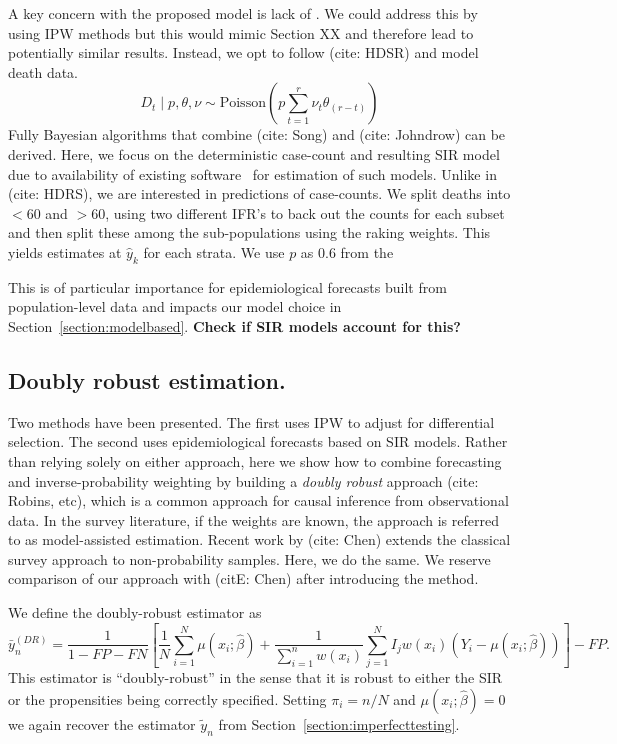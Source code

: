 \documentclass[11pt]{amsart}
\begin{document}
A key concern with the proposed model is lack of . We could address this by using IPW methods but this would mimic Section XX and therefore lead to potentially similar results.  Instead, we opt to follow (cite: HDSR) and model death data.
$$
D_t \mid p, \theta, \nu \sim \text{Poisson} \left( p \sum_{t=1}^r \nu_t \theta_{(r-t)} \right)
$$
Fully Bayesian algorithms that combine (cite: Song) and (cite: Johndrow) can be derived.  Here, we focus on the deterministic case-count and resulting SIR model due to availability of existing software~\cite{Song2020} for estimation of such models. Unlike in (cite: HDRS), we are interested in predictions of case-counts.  We split deaths into $<60$ and $>60$, using two different IFR's to back out the counts for each subset and then split these among the sub-populations using the raking weights.  This yields estimates at $\hat y_k$ for each strata.  We use $p$ as 0.6 from the


This is of particular importance for epidemiological forecasts built from population-level data and impacts our model choice in Section~\ref{section:modelbased}.
{\bf Check if SIR models account for this?}

\subsection{Doubly robust estimation.}
Two methods have been presented.  The first uses IPW to adjust for differential selection.  The second uses epidemiological forecasts based on SIR models.  Rather than relying solely on either approach, here we show how to combine forecasting and inverse-probability weighting by building a \emph{doubly robust} approach (cite: Robins, etc), which is a common approach for causal inference from observational data.  In the survey literature, if the weights are known, the approach is referred to as model-assisted estimation.  Recent work by (cite: Chen) extends the classical survey approach to non-probability samples.  Here, we do the same.  We reserve comparison of our approach with (citE: Chen) after introducing the method.

We define the doubly-robust estimator as
$$
\bar y_{n}^{(DR)} = \frac{1}{1 - FP - FN} \left[ \frac{1}{N} \sum_{i=1}^N \mu (x_i; \hat \beta) + \frac{1}{\sum_{i=1}^n w(x_i)} \sum_{j=1}^N I_j w(x_i) (Y_i - \mu(x_i; \hat \beta)) \right] - FP.
$$
This estimator is ``doubly-robust'' in the sense that it is robust to either the SIR or the propensities being correctly specified.  Setting $\pi_i = n/N$ and $\mu(x_i; \hat \beta) = 0$ we again recover the estimator $\tilde y_n$ from Section~\ref{section:imperfecttesting}.
\end{document}
